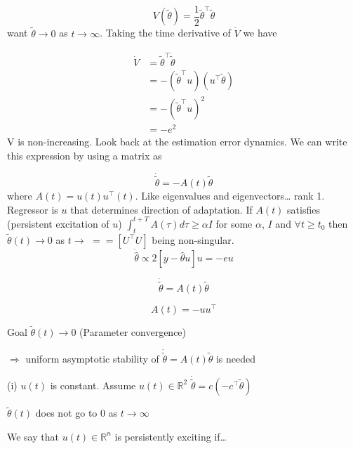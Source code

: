 \begin{equation*}
  V(\tilde{\theta})=\frac{1}{2}\tilde{\theta}^{\top}\tilde{\theta}
\end{equation*}
want $\tilde{\theta}\rightarrow0$ as $t\rightarrow\infty$.
Taking the time derivative of $\dot{V}$ we have

\begin{align*}
  \dot{V}&=\tilde{\theta}^{\top}\dot{\tilde{\theta}} \\
  &=-(\tilde{\theta}^{\top}u)(u^{\top}\tilde{\theta}) \\
  &=-(\tilde{\theta}^{\top}u)^{2} \\
  &=-e^{2}
\end{align*}
V is non-increasing.
Look back at the estimation error dynamics.
We can write this expression by using a matrix as

\begin{equation*}
  \dot{\tilde{\theta}}=-A(t)\tilde{\theta}
\end{equation*}
where $A(t)=u(t)u^{\top}(t)$.
Like eigenvalues and eigenvectors\ldots
rank 1.
Regressor is $u$ that determines direction of adaptation.
 If $A(t)$ satisfies (persistent excitation of $u$) $\int_{t}^{t+T}A(\tau)d\tau\geq \alpha I$ for some $\alpha$, $I$ and $\forall t\geq t_{0}$ then $\tilde{\theta}(t)\rightarrow0$ as $t\rightarrow$ $==[U^{\top}U]$ being non-singular.
\begin{equation*}
  \dot{\hat{\theta}}\propto2[y-\hat{\theta}u]u=-eu
\end{equation*}

\begin{equation*}
  \dot{\tilde{\theta}}=A(t)\tilde{\theta}
\end{equation*}

\begin{equation*}
  A(t)=-uu^{\top}
\end{equation*}

Goal $\tilde{\theta}(t)\rightarrow0$ (Parameter convergence)

$\Rightarrow$ uniform asymptotic stability of $\dot{\tilde{\theta}}=A(t)\tilde{\theta}$ is needed

(i) $u(t)$ is constant.
Assume $u(t)\in\mathbb{R}^{2}$
$\dot{\tilde{\theta}}=c(-c^{\top}\tilde{\theta})$


$\tilde{\theta}(t)$ does not go to $0$ as $t\rightarrow\infty$

We say that $u(t)\in\mathbb{R}^{n}$ is persistently exciting if\ldots

